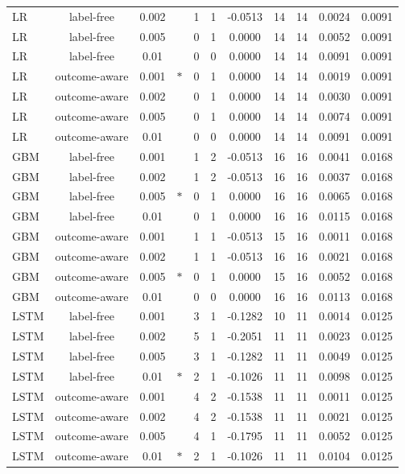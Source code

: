 \documentclass[10pt,onecolumn,letterpaper]{article}
\begin{document}
\begin{table}[!t]
{\begin{tabular}{lcccccccccc}
LR & label-free & 0.002 &  & 1 & 1 & -0.0513 & 14 & 14 & 0.0024 & 0.0091 \\
LR & label-free & 0.005 &  & 0 & 1 & 0.0000 & 14 & 14 & 0.0052 & 0.0091 \\
LR & label-free & 0.01 &  & 0 & 0 & 0.0000 & 14 & 14 & 0.0091 & 0.0091 \\
LR & outcome-aware & 0.001 & $\ast$ & 0 & 1 & 0.0000 & 14 & 14 & 0.0019 & 0.0091 \\
LR & outcome-aware & 0.002 &  & 0 & 1 & 0.0000 & 14 & 14 & 0.0030 & 0.0091 \\
LR & outcome-aware & 0.005 &  & 0 & 1 & 0.0000 & 14 & 14 & 0.0074 & 0.0091 \\
LR & outcome-aware & 0.01 &  & 0 & 0 & 0.0000 & 14 & 14 & 0.0091 & 0.0091 \\
GBM & label-free & 0.001 &  & 1 & 2 & -0.0513 & 16 & 16 & 0.0041 & 0.0168 \\
GBM & label-free & 0.002 &  & 1 & 2 & -0.0513 & 16 & 16 & 0.0037 & 0.0168 \\
GBM & label-free & 0.005 & $\ast$ & 0 & 1 & 0.0000 & 16 & 16 & 0.0065 & 0.0168 \\
GBM & label-free & 0.01 &  & 0 & 1 & 0.0000 & 16 & 16 & 0.0115 & 0.0168 \\
GBM & outcome-aware & 0.001 &  & 1 & 1 & -0.0513 & 15 & 16 & 0.0011 & 0.0168 \\
GBM & outcome-aware & 0.002 &  & 1 & 1 & -0.0513 & 16 & 16 & 0.0021 & 0.0168 \\
GBM & outcome-aware & 0.005 & $\ast$ & 0 & 1 & 0.0000 & 15 & 16 & 0.0052 & 0.0168 \\
GBM & outcome-aware & 0.01 &  & 0 & 0 & 0.0000 & 16 & 16 & 0.0113 & 0.0168 \\
LSTM & label-free & 0.001 &  & 3 & 1 & -0.1282 & 10 & 11 & 0.0014 & 0.0125 \\
LSTM & label-free & 0.002 &  & 5 & 1 & -0.2051 & 11 & 11 & 0.0023 & 0.0125 \\
LSTM & label-free & 0.005 &  & 3 & 1 & -0.1282 & 11 & 11 & 0.0049 & 0.0125 \\
LSTM & label-free & 0.01 & $\ast$ & 2 & 1 & -0.1026 & 11 & 11 & 0.0098 & 0.0125 \\
LSTM & outcome-aware & 0.001 &  & 4 & 2 & -0.1538 & 11 & 11 & 0.0011 & 0.0125 \\
LSTM & outcome-aware & 0.002 &  & 4 & 2 & -0.1538 & 11 & 11 & 0.0021 & 0.0125 \\
LSTM & outcome-aware & 0.005 &  & 4 & 1 & -0.1795 & 11 & 11 & 0.0052 & 0.0125 \\
LSTM & outcome-aware & 0.01 & $\ast$ & 2 & 1 & -0.1026 & 11 & 11 & 0.0104 & 0.0125 \\
\bottomrule
\end{tabular}}
\end{table}
\end{document}
